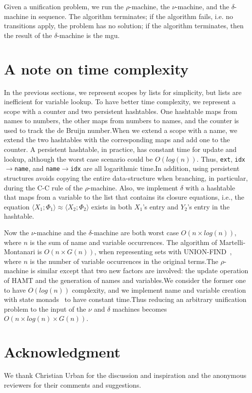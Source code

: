 \documentclass[a4paper,UKenglish]{lipics-v2016}
\newcommand{\clos}[2] {
\langle #1; #2 \rangle
}
\newcommand{\aeq}[4] {
\clos{#1}{#2} \approx \clos{#3}{#4}
}
\newcommand*{\transname}[1]{\textsc{#1}}
\begin{document}
\begin{conjecture}\label{lemma:rmachine}
  Given a unification problem, we run the $\rho$-machine,
  the $\nu$-machine, and the $\delta$-machine in sequence.
  The algorithm terminates;
  if the algorithm fails, i.e. no transitions apply,
  the problem has no solution;
  if the algorithm terminates, then the result of the $\delta$-machine
  is the mgu.
\end{conjecture}

\section{A note on time complexity}
\label{efficiency}

In the previous sections, we represent scopes by lists for simplicity,
but lists are inefficient for variable lookup. To have better time
complexity, we represent a scope with a counter and two persistent
hashtables. One
hashtable maps from names to numbers, the other maps from numbers to
names, and the counter is used to track the de Bruijn number.When we
extend a scope with a name, we extend the two hashtables with the
corresponding maps and add one to the counter. A persistent
hashtable, in practice, has constant time for update and lookup,
although the worst case scenario could be $O(log(n))$. Thus,
\texttt{ext}, \texttt{idx$\rightarrow$name}, and
\texttt{name$\rightarrow$idx} are all logarithmic time.In addition,
using persistent structures avoids copying the entire data-structure
when branching, in particular, during the \transname{C-C} rule of
the $\rho$-machine.
Also, we implement $\delta$ with a hashtable that maps from a variable to
the list that contains its closure equations,
i.e., the equation $\aeq{X_1}{\Phi_1}{X_2}{\Phi_2}$
exists in both $X_1$'s entry and $Y_2$'s entry in the hashtable.

Now the $\nu$-machine and the
$\delta$-machine are both worst case $O(n \times log(n))$,
where $n$ is the sum of name and variable occurrences.
The algorithm of Martelli-Montanari is $O(n \times G(n))$, when
representing sets with UNION-FIND~\citep{tarjan_efficiency_1975}, where
$n$ is the number of variable occurrences in the original terms.The
$\rho$-machine is similar except that two new factors are involved:
the update operation of HAMT and the generation of names and
variables.We consider the former one to have $O(log(n))$ complexity,
and we implement name and variable creation with state
monads~\citep{moggi_notions_1991} to have
constant time.Thus reducing an arbitrary unification problem to the
input of the $\nu$ and $\delta$ machines becomes $O(n \times log(n) \times
G(n))$.

\section*{Acknowledgment}
We thank Christian Urban for the discussion and inspiration
and the anonymous reviewers for their comments and suggestions.


\end{document}
